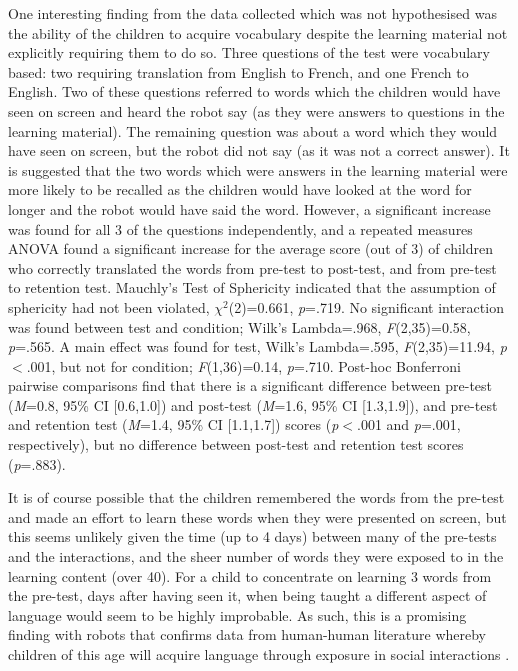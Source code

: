 One interesting finding from the data collected which was not hypothesised was the ability of the children to acquire vocabulary despite the learning material not explicitly requiring them to do so. Three questions of the test were vocabulary based: two requiring translation from English to French, and one French to English. Two of these questions referred to words which the children would have seen on screen and heard the robot say (as they were answers to questions in the learning material). The remaining question was about a word which they would have seen on screen, but the robot did not say (as it was not a correct answer). It is suggested that the two words which were answers in the learning material were more likely to be recalled as the children would have looked at the word for longer and the robot would have said the word. However, a significant increase was found for all 3 of the questions independently, and a repeated measures ANOVA found a significant increase for the average score (out of 3) of children who correctly translated the words from pre-test to post-test, and from pre-test to retention test. Mauchly's Test of Sphericity indicated that the assumption of sphericity had not been violated, $\chi^2$(2)=0.661, \textit{p}=.719. No significant interaction was found between test and condition; Wilk's Lambda=.968, \textit{F}(2,35)=0.58, \textit{p}=.565. A main effect was found for test, Wilk's Lambda=.595, \textit{F}(2,35)=11.94, \textit{p}$<$.001, but not for condition; \textit{F}(1,36)=0.14, \textit{p}=.710. Post-hoc Bonferroni pairwise comparisons find that there is a significant difference between pre-test (\textit{M}=0.8, 95\% CI [0.6,1.0]) and post-test (\textit{M}=1.6, 95\% CI [1.3,1.9]), and pre-test and retention test (\textit{M}=1.4, 95\% CI [1.1,1.7]) scores (\textit{p}$<$.001 and \textit{p}=.001, respectively), but no difference between post-test and retention test scores (\textit{p}=.883).

It is of course possible that the children remembered the words from the pre-test and made an effort to learn these words when they were presented on screen, but this seems unlikely given the time (up to 4 days) between many of the pre-tests and the interactions, and the sheer number of words they were exposed to in the learning content (over 40). For a child to concentrate on learning 3 words from the pre-test, days after having seen it, when being taught a different aspect of language would seem to be highly improbable. As such, this is a promising finding with robots that confirms data from human-human literature whereby children of this age will acquire language through exposure in social interactions \citep{kuhl2010brain}.

